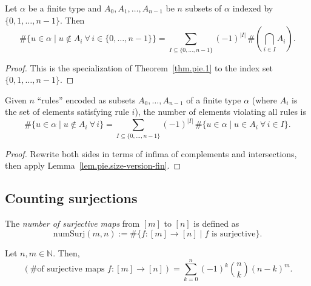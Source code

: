 \begin{lemma}
\label{lem.pie.size-version-fin}
\leanhelper
\leanok
Let $\alpha$ be a finite type and $A_0, A_1, \ldots, A_{n-1}$ be $n$ subsets of $\alpha$
indexed by $\{0, 1, \ldots, n{-}1\}$. Then
\[
\#\{u \in \alpha \mid u \notin A_i\ \forall\, i \in \{0, \ldots, n{-}1\}\}
= \sum_{I \subseteq \{0, \ldots, n{-}1\}} (-1)^{|I|}\, \#\!\left(\bigcap_{i \in I} A_i\right).
\]
\end{lemma}

\begin{proof}
This is the specialization of Theorem~\ref{thm.pie.1} to the index set
$\{0, 1, \ldots, n{-}1\}$.
\end{proof}

\begin{lemma}
\label{lem.pie.rule-breaking}
\leanhelper
\leanok
Given $n$ ``rules'' encoded as subsets $A_0, \ldots, A_{n-1}$ of a finite type
$\alpha$ (where $A_i$ is the set of elements satisfying rule $i$), the number
of elements violating all rules is
\[
\#\{u \in \alpha \mid u \notin A_i\ \forall\, i\}
= \sum_{I \subseteq \{0, \ldots, n{-}1\}} (-1)^{|I|}\,
\#\{u \in \alpha \mid u \in A_i\ \forall\, i \in I\}.
\]
\end{lemma}

\begin{proof}
Rewrite both sides in terms of infima of complements and intersections,
then apply Lemma~\ref{lem.pie.size-version-fin}.
\end{proof}

\subsection{Counting surjections}

\begin{definition}
\label{def.pie.numSurj}
\leanhelper
\leanok
The \emph{number of surjective maps} from $[m]$ to $[n]$
is defined as
\[
\mathrm{numSurj}(m, n) := \#\{f\colon [m] \to [n] \mid f \text{ is surjective}\}.
\]
\end{definition}

\begin{theorem}
\label{thm.pie.count-sur}
\leantarget
\leanok
Let $n, m \in \mathbb{N}$. Then,
\[
\left(\text{\# of surjective maps } f\colon [m] \to [n]\right)
= \sum_{k=0}^{n} (-1)^k \binom{n}{k} (n-k)^m.
\]
\end{theorem}

